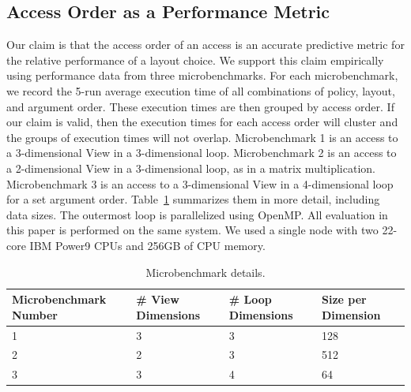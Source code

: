 \documentclass[sigconf,review=true]{acmart}
\begin{document}
\subsection{Access Order as a Performance Metric}
\label{sec:AccessMetric}
Our claim is that the access order of an access is an accurate predictive metric for the relative performance of a layout choice. 
We support this claim empirically using performance data from three microbenchmarks.
For each microbenchmark, we record the 5-run average execution time of all combinations of policy, layout, and argument order. 
These execution times are then grouped by access order.
If our claim is valid, then the execution times for each access order will cluster and the groups of execution times will not overlap.
Microbenchmark 1 is an access to a 3-dimensional View in a 3-dimensional loop. 
Microbenchmark 2 is an access to a 2-dimensional View in a 3-dimensional loop, as in a matrix multiplication.
Microbenchmark 3 is an access to a 3-dimensional View in a 4-dimensional loop for a set argument order.
Table~\ref{MicrobenchmarkDetails} summarizes them in more detail, including data sizes.
The outermost loop is parallelized using OpenMP.
All evaluation in this paper is performed on the same system. 
We used a single node with two 22-core IBM Power9 CPUs and 256GB of CPU memory.

\begin{table}
	\centering
	\begin{tabular}{p{2.2cm}|p{1.6cm}|p{1.6cm}|p{1.5cm}}

		\raggedright Microbenchmark \linebreak Number & \raggedright \# View \linebreak Dimensions & \raggedright \# Loop \linebreak Dimensions & \raggedright Size per \linebreak Dimension \tabularnewline
		\hline
		1 & 3 & 3 & 128 \\
		2 & 2 & 3 & 512 \\
		3 & 3 & 4 & 64 
	\end{tabular}
	\caption{Microbenchmark details.}
	\label{MicrobenchmarkDetails}
\end{table}
\end{document}
